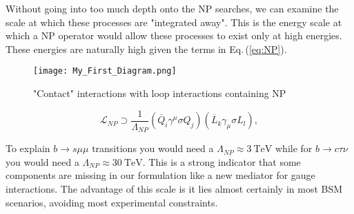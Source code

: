 Without going into too much depth onto the NP searches, we can examine the scale at which these processes are "integrated away". 
%
This is the energy scale at which a NP operator would allow these processes to exist only at high energies. These energies are naturally high given the terms in Eq.\,(\ref{eq:NP}). 
%
\bigbreak
%
\noindent\begin{minipage}{.35\textwidth}
	\begin{figure}[H]
		\label{fig:contactNP}
		\centering
		\texttt{[image: My\_First\_Diagram.png]}
		\caption{"Contact" interactions with loop interactions containing NP}
	\end{figure}
\end{minipage}
\begin{minipage}{.6\textwidth}
\begin{equation}
\label{eq:NP}
\mathcal{L}_{NP} \supset \frac{1}{\Lambda_{NP}} (\overline{Q}_i \gamma^\mu \sigma Q_j ) (\overline{L}_k \gamma_\mu \sigma L_l) ,  
\end{equation}
\end{minipage}
%
\bigbreak
%
To explain $b \rightarrow s \mu \mu$ transitions you would need a $\Lambda_{NP} \approx 3 \ \text{TeV}$ while for $b \rightarrow c \tau \nu$ you would need a $\Lambda_{NP} \approx 30\ \text{TeV}$. This is a strong indicator that some components are missing in our formulation like a new mediator for gauge interactions. The advantage of this scale is it lies almost certainly in most BSM scenarios, avoiding most experimental constraints.


